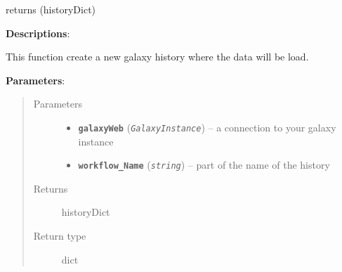 \documentclass[letterpaper,10pt,english]{sphinxmanual}
\begin{document}
\begin{fulllineitems}
\label{datamanagerpkg:datamanagerpkg.GalaxyCommunication_data_manager.Create_History}
returns (historyDict)

\textbf{Descriptions}:

This function create a new galaxy history where the data will be load.

\textbf{Parameters}:
\begin{quote}\begin{description}
\item[{Parameters}] \leavevmode\begin{itemize}
\item {} 
\textbf{\texttt{galaxyWeb}} (\emph{\texttt{GalaxyInstance}}) -- a connection to your galaxy instance

\item {} 
\textbf{\texttt{workflow\_Name}} (\emph{\texttt{string}}) -- part of the name of the history

\end{itemize}

\item[{Returns}] \leavevmode
historyDict

\item[{Return type}] \leavevmode
dict

\end{description}\end{quote}

\end{fulllineitems}

\end{document}
